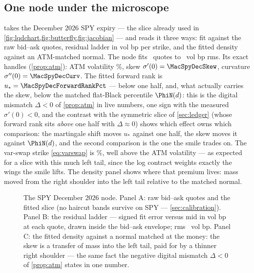 \subsection{One node under the microscope}

 takes the December 2026 SPY expiry --- the slice
already used in \cref{fig:lqdchart,fig:butterfly,fig:jacobian} --- and
reads it three ways: fit against the raw bid--ask quotes, residual
ladder in vol bp per strike, and the fitted density against an
ATM-matched normal.  The node fits \MacSpyDecNQuotes\ quotes to
\MacSpyDecRmsBp\ vol bp rms.  Its exact handles (\cref{prop:atm}): ATM
volatility \MacSpyDecAtmVolPct\%, skew $\sigma'(0)=\MacSpyDecSkew$,
curvature $\sigma''(0)=\MacSpyDecCurv$.  The fitted forward rank is
$u_*=\MacSpyDecForwardRankPct$ --- below one half, and, what actually
carries the skew, below the matched flat-Black percentile $\PhiN(d)$:
this is the digital mismatch $\Delta<0$ of \cref{prop:atm} in live
numbers, one sign with the measured $\sigma'(0)<0$, and the contrast
with the symmetric slice of \cref{sec:ledger} (whose forward rank sits
\emph{above} one half with $\Delta\approx0$) shows which effect owns
which comparison: the martingale shift moves $u_*$ against one half,
the skew moves it against $\PhiN(d)$, and the second comparison is the
one the smile trades on.  The var-swap strike \eqref{eq:varswap} is
\MacSpyDecVarSwapPct\%, well above the ATM volatility --- as expected
for a slice with this much left tail, since the log contract weights
exactly the wings the smile lifts.  The density panel shows where that
premium lives: mass moved from the right shoulder into the left tail
relative to the matched normal.

\begin{figure}[htbp]
\centering
{}
\caption{The SPY December 2026 node.  Panel A: raw bid--ask quotes and
the fitted slice (no haircut bands survive on SPY ---
\cref{sec:calibration}).  Panel B: the residual ladder --- signed fit
error versus mid in vol bp at each quote, drawn inside the bid--ask
envelope; rms \MacSpyDecRmsBp\ vol bp.  Panel C: the fitted density
against a normal matched at the money: the skew is a transfer of mass
into the left tail, paid for by a thinner right shoulder --- the same
fact the negative digital mismatch $\Delta<0$ of \cref{prop:atm} states
in one number.}
\label{fig:spy_node}
\end{figure}

